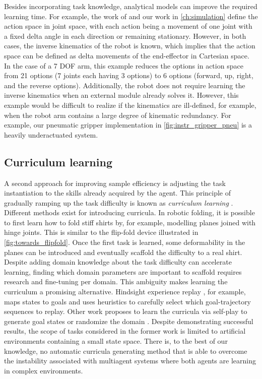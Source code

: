 \documentclass[\home/main.tex]{subfiles}
\begin{document}
Besides incorporating task knowledge, analytical models can improve the required learning time. For example, the work of \textcite{Zhang2015} and our work in \cref{ch:simulation} define the action space in joint space, with each action being a movement of one joint with a fixed delta angle in each direction or remaining stationary. However, in both cases, the inverse kinematics of the robot is known, which implies that the action space can be defined as delta movements of the end-effector in Cartesian space. In the case of a 7 \gls{DOF} arm, this example reduces the options in action space from 21 options (7 joints each having 3 options) to 6 options (forward, up, right, and the reverse options). Additionally, the robot does not require learning the inverse kinematics when an external module already solves it. However, this example would be difficult to realize if the kinematics are ill-defined, for example, when the robot arm contains a large degree of kinematic redundancy. For example, our pneumatic gripper implementation in \cref{fig:instr_gripper_pneu} is a heavily underactuated system.

\subsection{Curriculum learning}
A second approach for improving sample efficiency is adjusting the task instantiation to the skills already acquired by the agent. This principle of gradually ramping up the task difficulty is known as \emph{curriculum learning} \autocite{Selfridge1985}. Different methods exist for introducing curricula. In robotic folding, it is possible to first learn how to fold stiff shirts by, for example, modelling planes joined with hinge joints. This is similar to the flip-fold device illustrated in \cref{fig:towards_flipfold}. Once the first task is learned, some deformability in the planes can be introduced and eventually scaffold the difficulty to a real shirt. Despite adding domain knowledge about the task difficulty can accelerate learning, finding which domain parameters are important to scaffold requires research and fine-tuning per domain. This ambiguity makes learning the curriculum a promising alternative.
Hindsight experience replay \autocite{andrychowicz2017hindsight}, for example, maps states to goals and uses heuristics to carefully select which goal-trajectory sequences to replay. Other work proposes to learn the curricula via self-play to generate goal states \autocite{sukhbaatar2017intrinsic} or randomize the domain \autocite{raparthy2020generating}. Despite demonstrating successful results, the scope of tasks considered in the former work is limited to artificial environments containing a small state space. There is, to the best of our knowledge, no automatic curricula generating method that is able to overcome the instability associated with multiagent systems where both agents are learning in complex environments.
\end{document}
